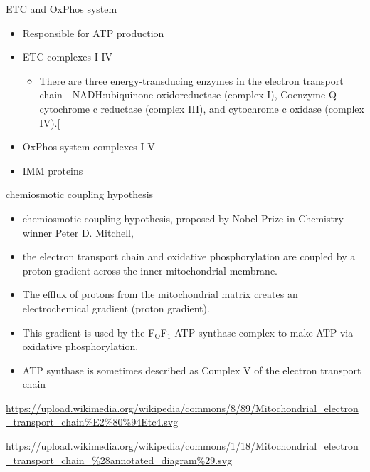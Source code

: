 \documentclass[presentation, smaller]{beamer}
\begin{document}
\begin{frame}[label={sec:org6b8b4f6}]{ETC and OxPhos system}
\begin{itemize}
\item Responsible for ATP production
\item ETC complexes I-IV
\begin{itemize}
\item There are three energy-transducing enzymes in the electron transport chain - NADH:ubiquinone oxidoreductase (complex I), Coenzyme Q – cytochrome c reductase (complex III), and cytochrome c oxidase (complex IV).[
\end{itemize}
\item OxPhos system complexes I-V
\item IMM proteins
\end{itemize}
\begin{block}{chemiosmotic coupling hypothesis}
\begin{itemize}
\item chemiosmotic coupling hypothesis, proposed by Nobel Prize in Chemistry winner Peter D. Mitchell,
\item the electron transport chain and oxidative phosphorylation are coupled by a proton gradient across the inner mitochondrial membrane.
\item The efflux of protons from the mitochondrial matrix creates an electrochemical gradient (proton gradient).
\item This gradient is used by the F\(_{\text{O}}\)F\(_{\text{1}}\) ATP synthase complex to make ATP via oxidative phosphorylation.
\item ATP synthase is sometimes described as Complex V of the electron transport chain
\end{itemize}

\url{https://upload.wikimedia.org/wikipedia/commons/8/89/Mitochondrial\_electron\_transport\_chain\%E2\%80\%94Etc4.svg}

\url{https://upload.wikimedia.org/wikipedia/commons/1/18/Mitochondrial\_electron\_transport\_chain\_\%28annotated\_diagram\%29.svg}
\end{block}
\end{frame}
\end{document}
